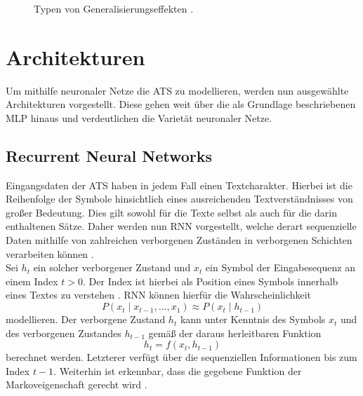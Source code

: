 \begin{figure}[h!]
  \centering
  \caption{Typen von Generalisierungseffekten \cite{EDPOJ}.}
  \label{pic:FittingTypes}
\end{figure}


\section{Architekturen}
\noindent
Um mithilfe neuronaler Netze die \ac{ATS} zu modellieren, werden nun ausgewählte Architekturen vorgestellt. Diese gehen weit über die als Grundlage beschriebenen \ac{MLP} hinaus und verdeutlichen die Varietät neuronaler Netze.


\subsection{Recurrent Neural Networks}
\noindent
Eingangsdaten der \ac{ATS} haben in jedem Fall einen Textcharakter. Hierbei ist die Reihenfolge der Symbole hinsichtlich eines ausreichenden Textverständnisses von großer Bedeutung. Dies gilt sowohl für die Texte selbst als auch für die darin enthaltenen Sätze. Daher werden nun \ac{RNN} vorgestellt, welche derart sequenzielle Daten mithilfe von zahlreichen verborgenen Zuständen in verborgenen Schichten verarbeiten können \cite[S.~301]{ZHA20}.\\

\noindent
Sei $h_t$ ein solcher verborgener Zustand und $x_t$ ein Symbol der Eingabesequenz an einem Index $t > 0$. Der Index ist hierbei als Position eines Symbols innerhalb eines Textes zu verstehen \cite{VAS17}. \ac{RNN} können hierfür die Wahrscheinlichkeit $$P(x_t \mid x_{t-1}, ... , x_1) \approx P(x_t \mid h_{t-1})$$ modellieren. Der verborgene Zustand $h_t$ kann unter Kenntnis des Symbols $x_t$ und des verborgenen Zustandes $h_{t-1}$ gemäß der daraus herleitbaren Funktion $$h_t = f(x_t, h_{t-1})$$ berechnet werden. Letzterer verfügt über die sequenziellen Informationen bis zum Index $t-1$. Weiterhin ist erkennbar, dass die gegebene Funktion der Markoveigenschaft gerecht wird \cite[S.~323-324]{ZHA20}.\\

